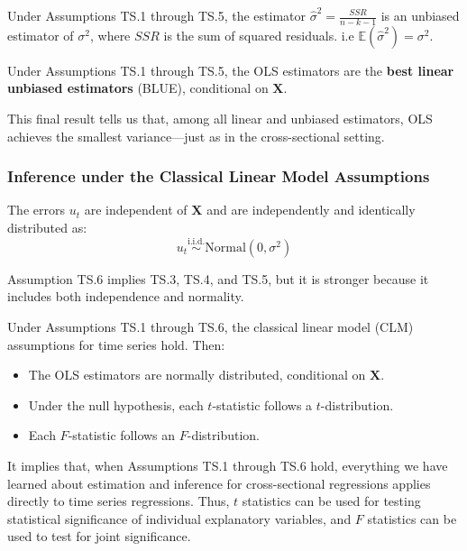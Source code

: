 \documentclass[a4paper, 10pt]{article}
\theoremstyle{definition}	%
\begin{document}
\begin{tcolorbox}[colback=blue!5!white, colframe=blue!80!black, title=Theorem 10.3 -- Unbiased Estimation of \( \sigma^2 \)]
Under Assumptions TS.1 through TS.5, the estimator $\hat{\sigma}^2 = \frac{SSR}{n - k - 1}$
is an unbiased estimator of \( \sigma^2 \), where \( SSR \) is the sum of squared residuals.
i.e $\mathbb{E}(\hat{\sigma}^2) = \sigma^2$. 
\end{tcolorbox}

\begin{tcolorbox}[colback=blue!5!white, colframe=blue!80!black, title=Theorem 10.4 -- Gauss–Markov Theorem]
Under Assumptions TS.1 through TS.5, the OLS estimators are the \textbf{best linear unbiased estimators} (BLUE), conditional on \( \mathbf{X} \).
\end{tcolorbox}
This final result tells us that, among all linear and unbiased estimators, OLS achieves the smallest variance—just as in the cross-sectional setting.

\subsubsection{Inference under the Classical Linear Model Assumptions}

\begin{tcolorbox}[colback=blue!5!white, colframe=blue!80!black, title=Assumption TS.6 -- Normality]
The errors \( u_t \) are independent of \( \mathbf{X} \) and are independently and identically distributed as:
\[
u_t \overset{\text{i.i.d.}}{\sim} \text{Normal}(0, \sigma^2)
\]
\end{tcolorbox}
Assumption TS.6 implies TS.3, TS.4, and TS.5, but it is stronger because it includes both independence and normality.
\begin{tcolorbox}[colback=blue!5!white, colframe=blue!80!black, title=Theorem 10.5 -- Normal Sampling Distributions]
Under Assumptions TS.1 through TS.6, the classical linear model (CLM) assumptions for time series hold. Then:
\begin{itemize}
  \item The OLS estimators are normally distributed, conditional on \( \mathbf{X} \).
  \item Under the null hypothesis, each \( t \)-statistic follows a \( t \)-distribution.
  \item Each \( F \)-statistic follows an \( F \)-distribution.
\end{itemize}
\end{tcolorbox}
It implies that, when Assumptions TS.1 through TS.6 hold, everything we have learned about estimation and inference for cross-sectional regressions applies directly to time series regressions. Thus, $t$ statistics can be used for testing statistical significance of individual explanatory variables, and $F$ statistics can be used to test for joint significance.
\end{document}

